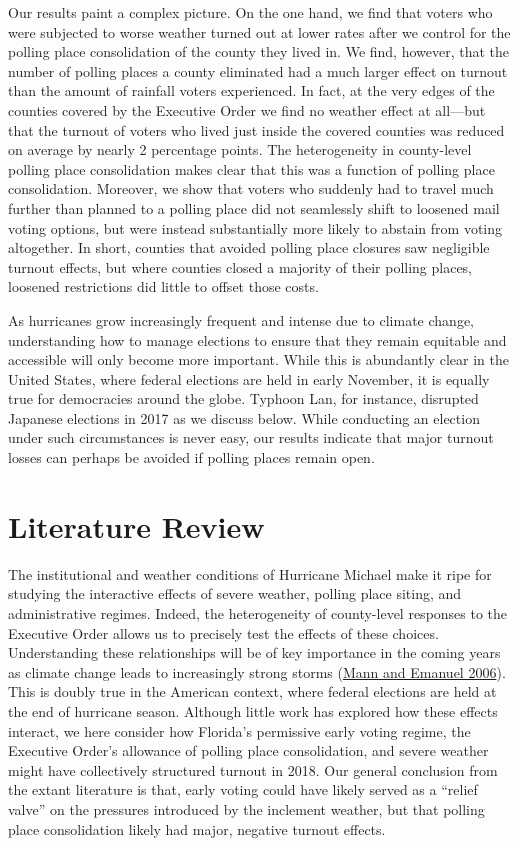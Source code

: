 \documentclass[
  12pt,
]{article}
\begin{document}
Our results paint a complex picture. On the one hand, we find that voters who were subjected to worse weather turned out at lower rates after we control for the polling place consolidation of the county they lived in. We find, however, that the number of polling places a county eliminated had a much larger effect on turnout than the amount of rainfall voters experienced. In fact, at the very edges of the counties covered by the Executive Order we find no weather effect at all---but that the turnout of voters who lived just inside the covered counties was reduced on average by nearly 2 percentage points. The heterogeneity in county-level polling place consolidation makes clear that this was a function of polling place consolidation. Moreover, we show that voters who suddenly had to travel much further than planned to a polling place did not seamlessly shift to loosened mail voting options, but were instead substantially more likely to abstain from voting altogether. In short, counties that avoided polling place closures saw negligible turnout effects, but where counties closed a majority of their polling places, loosened restrictions did little to offset those costs.

As hurricanes grow increasingly frequent and intense due to climate change, understanding how to manage elections to ensure that they remain equitable and accessible will only become more important. While this is abundantly clear in the United States, where federal elections are held in early November, it is equally true for democracies around the globe. Typhoon Lan, for instance, disrupted Japanese elections in 2017 as we discuss below. While conducting an election under such circumstances is never easy, our results indicate that major turnout losses can perhaps be avoided if polling places remain open.

\hypertarget{literature-review}{%
\section*{Literature Review}\label{literature-review}}

The institutional and weather conditions of Hurricane Michael make it ripe for studying the interactive effects of severe weather, polling place siting, and administrative regimes. Indeed, the heterogeneity of county-level responses to the Executive Order allows us to precisely test the effects of these choices. Understanding these relationships will be of key importance in the coming years as climate change leads to increasingly strong storms (\protect\hyperlink{ref-Mann2006}{Mann and Emanuel 2006}). This is doubly true in the American context, where federal elections are held at the end of hurricane season. Although little work has explored how these effects interact, we here consider how Florida's permissive early voting regime, the Executive Order's allowance of polling place consolidation, and severe weather might have collectively structured turnout in 2018. Our general conclusion from the extant literature is that, early voting could have likely served as a ``relief valve'' on the pressures introduced by the inclement weather, but that polling place consolidation likely had major, negative turnout effects.
\end{document}
